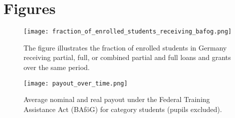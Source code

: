 \newpage
\section{Figures}
\renewcommand{\thefigure}{\thesection \arabic{figure}}
\setcounter{figure}{0}


\begin{figure}[H]
  \centering

  \begin{minipage}[t]{0.48\textwidth}
    \centering
    \texttt{[image: fraction\_of\_enrolled\_students\_receiving\_bafog.png]}
    \caption{
      The figure illustrates the fraction of enrolled students in Germany receiving partial, full, or combined partial and full loans and grants over the same period.
    }
  \label{figure:bafoeg_support}
  \end{minipage}%
  \hfill
  \begin{minipage}[t]{0.48\textwidth}
    \centering
    \texttt{[image: payout\_over\_time.png]}
    \caption{Average nominal and real payout under the Federal Training Assistance Act (BAföG) for category students (pupils excluded).}
  \label{figure:payout_over_time}
  \end{minipage}

\end{figure}

